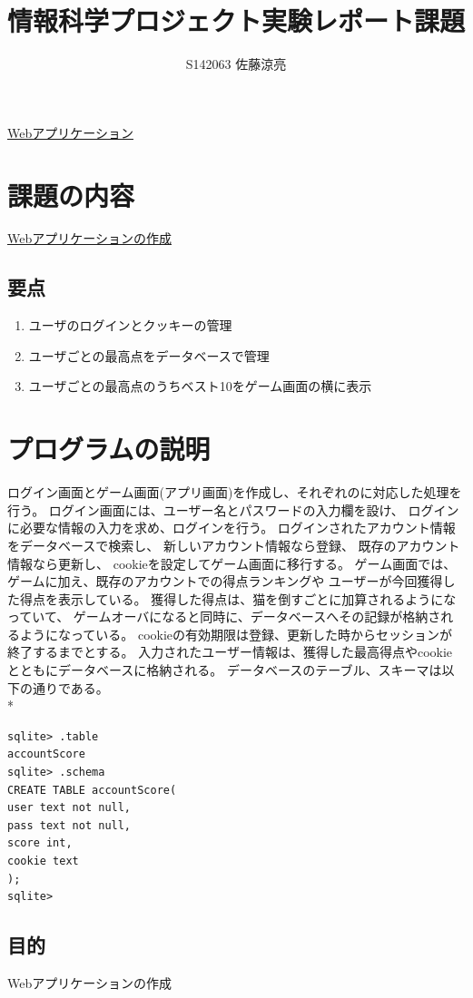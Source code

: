 \documentclass[a4j]{jarticle}
\title{情報科学プロジェクト実験レポート課題}
\author{S142063 佐藤涼亮}
\begin{document}
\maketitle
\centerline{\LARGE \underline{Webアプリケーション}}
\section{課題の内容}
{\large \underline{Webアプリケーションの作成}}
\subsection{要点}
\begin{enumerate}
\item ユーザのログインとクッキーの管理
\item ユーザごとの最高点をデータベースで管理
\item ユーザごとの最高点のうちベスト10をゲーム画面の横に表示
\end{enumerate}
\section{プログラムの説明}
ログイン画面とゲーム画面(アプリ画面)を作成し、それぞれのに対応した処理を行う。
ログイン画面には、ユーザー名とパスワードの入力欄を設け、
ログインに必要な情報の入力を求め、ログインを行う。
ログインされたアカウント情報をデータベースで検索し、
新しいアカウント情報なら登録、
既存のアカウント情報なら更新し、
cookieを設定してゲーム画面に移行する。
ゲーム画面では、ゲームに加え、既存のアカウントでの得点ランキングや
ユーザーが今回獲得した得点を表示している。
獲得した得点は、猫を倒すごとに加算されるようになっていて、
ゲームオーバになると同時に、データベースへその記録が格納されるようになっている。
cookieの有効期限は登録、更新した時からセッションが終了するまでとする。
\newpage
入力されたユーザー情報は、獲得した最高得点やcookieとともにデータベースに格納される。
データベースのテーブル、スキーマは以下の通りである。\\*
\begin{screen}
\begin{verbatim}
sqlite> .table
accountScore
sqlite> .schema
CREATE TABLE accountScore(
user text not null,
pass text not null,
score int,
cookie text
);
sqlite>
\end{verbatim}
\end{screen}

\subsection{目的}
Webアプリケーションの作成
\end{document}
